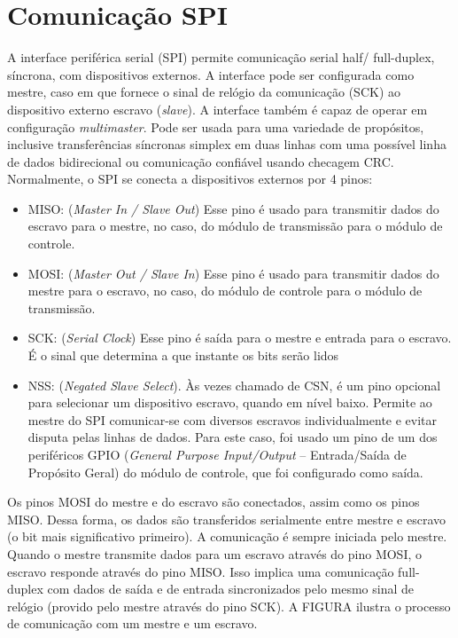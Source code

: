 \chapter{Comunicação SPI}\label{cap:com_spi}

A interface periférica serial (SPI) permite comunicação serial half/ full-duplex, síncrona, com dispositivos externos. A interface pode ser configurada como mestre, caso em que fornece o sinal de relógio da comunicação (SCK) ao dispositivo externo escravo (\textit{slave}). A 
interface também é capaz de operar em configuração \textit{multimaster}.
Pode ser usada para uma variedade de propósitos, inclusive transferências síncronas simplex em duas linhas com uma possível linha de dados bidirecional ou comunicação confiável usando checagem CRC.
Normalmente, o SPI se conecta a dispositivos externos por 4 pinos:
\begin{itemize}
\item MISO: (\textit{Master In / Slave Out}) Esse pino é usado para transmitir dados do escravo para o mestre, no caso, do módulo de transmissão para o módulo de controle.
\item MOSI: (\textit{Master Out / Slave In}) Esse pino é usado para transmitir dados do mestre para o escravo, no caso, do módulo de controle para o módulo de transmissão.
\item SCK: (\textit{Serial Clock}) Esse pino é saída para o mestre e entrada para o escravo. É o sinal que determina a que instante os bits serão lidos
\item NSS: (\textit{Negated Slave Select}). Às vezes chamado de CSN, é um pino opcional para selecionar um dispositivo escravo, quando em nível baixo. Permite ao mestre do SPI comunicar-se com diversos escravos individualmente e evitar disputa pelas linhas de dados. Para este caso, foi usado um pino de um dos periféricos GPIO (\textit{General Purpose Input/Output} – Entrada/Saída de Propósito Geral) do módulo de controle, que foi configurado como saída.
\end{itemize}

Os pinos MOSI do mestre e do escravo são conectados, assim como os pinos MISO. Dessa forma, os dados são transferidos serialmente entre mestre e escravo (o bit mais significativo primeiro).
A comunicação é sempre iniciada pelo mestre. Quando o mestre transmite dados para um escravo através do pino MOSI, o escravo responde através do pino MISO. Isso implica uma comunicação full-duplex com dados de saída e de entrada sincronizados pelo mesmo sinal de relógio (provido pelo mestre através do pino SCK).
A FIGURA ilustra o processo de comunicação com um mestre e um escravo.

